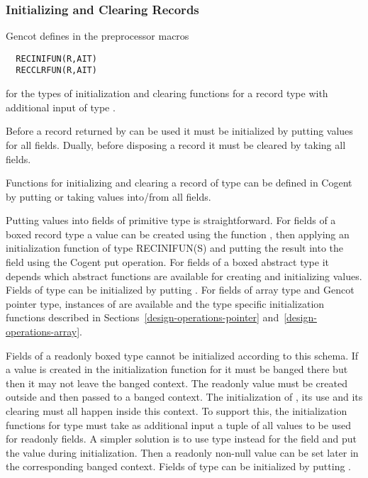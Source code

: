 \subsubsection{Initializing and Clearing Records}

Gencot defines in  the preprocessor macros
\begin{verbatim}
  RECINIFUN(R,AIT)
  RECCLRFUN(R,AIT)
\end{verbatim}
for the types of initialization and clearing functions for a record type  with additional input of type .

Before a record returned by  can be used it must be initialized by putting values for all fields. 
Dually, before disposing a record it must be cleared by taking all fields.

Functions
for initializing and clearing a record  of type  can be defined in Cogent by putting or taking values 
into/from all fields.

Putting values into fields of primitive type is straightforward. For fields of a boxed record type  a value can be created 
using the function , then applying an initialization function of type RECINIFUN(S) and putting the result into the field using the
Cogent put operation. For fields of a boxed abstract type it depends which abstract functions are available for creating and 
initializing values. Fields of type  can be initialized by putting . For fields of array type and Gencot
pointer type, instances of  are available and the type specific initialization functions described in 
Sections~\ref{design-operations-pointer} and~\ref{design-operations-array}.

Fields of a readonly boxed type  cannot be initialized according to this schema. If a value is created in the 
initialization function for  it must be banged there but then it may not leave the banged context. The readonly value must be created
outside and then passed to a banged context. The initialization of , its use and its clearing must all happen inside
this context. To support this, the initialization functions for type  must take as additional input a tuple of all
values to be used for readonly fields. A simpler solution is to use type  instead for the field and 
put the value  during initialization. Then a readonly non-null value can be set later in the corresponding
banged context. Fields of type  can be initialized by putting .

